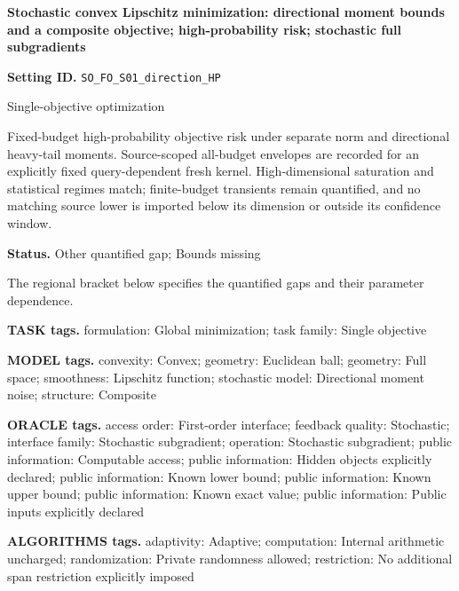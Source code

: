 \documentclass[10pt,a4paper]{article}
\begin{document}
\raggedright

{\LARGE\bfseries\sffamily\color{AtlasNavy} Stochastic convex Lipschitz minimization: directional moment bounds and a composite objective; high-probability risk; stochastic full subgradients\par}\vspace{5pt}


\textbf{Setting ID.} \texttt{SO\_\allowbreak{}FO\_\allowbreak{}S01\_\allowbreak{}direction\_\allowbreak{}HP}



Single-objective optimization



Fixed-budget high-probability objective risk under separate norm and directional heavy-tail moments. Source-scoped all-budget envelopes are recorded for an explicitly fixed query-dependent fresh kernel. High-dimensional saturation and statistical regimes match; finite-budget transients remain quantified, and no matching source lower is imported below its dimension or outside its confidence window.



\textbf{Status.} Other quantified gap; Bounds missing



The regional bracket below specifies the quantified gaps and their parameter dependence.



\textbf{TASK tags.} formulation: Global minimization; task family: Single objective



\textbf{MODEL tags.} convexity: Convex; geometry: Euclidean ball; geometry: Full space; smoothness: Lipschitz function; stochastic model: Directional moment noise; structure: Composite



\textbf{ORACLE tags.} access order: First-order interface; feedback quality: Stochastic; interface family: Stochastic subgradient; operation: Stochastic subgradient; public information: Computable access; public information: Hidden objects explicitly declared; public information: Known lower bound; public information: Known upper bound; public information: Known exact value; public information: Public inputs explicitly declared



\textbf{ALGORITHMS tags.} adaptivity: Adaptive; computation: Internal arithmetic uncharged; randomization: Private randomness allowed; restriction: No additional span restriction explicitly imposed
\end{document}

